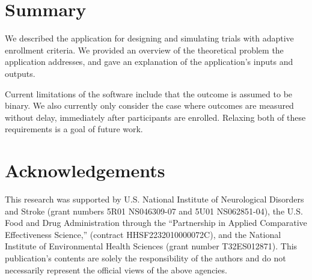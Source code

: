 \documentclass[article]{jss}
\begin{document}
\section*{Summary}
\label{sec:Summary}

We described the  application for designing and simulating trials with adaptive enrollment criteria. We provided an overview of the theoretical problem the application addresses, and gave an explanation of the application's inputs and outputs.

Current limitations of the software include that the outcome is assumed to be binary. We also currently only consider the case where outcomes are measured without delay, immediately after participants are enrolled. Relaxing both of these requirements is a goal of future work.


\section*{Acknowledgements}
\label{sec:acknowledgements}
This research was supported by U.S. National Institute of Neurological Disorders and Stroke (grant numbers 5R01 NS046309-07 and 5U01 NS062851-04), the U.S. Food and Drug Administration through the ``Partnership in Applied Comparative Effectiveness Science,'' (contract HHSF2232010000072C), and the National Institute of Environmental Health Sciences (grant number T32ES012871). This publication's contents are solely the responsibility of the authors and do not necessarily represent the official views of the above agencies.


%
 
\end{document}
